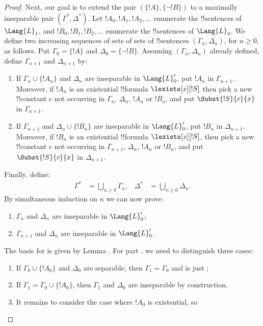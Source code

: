 \documentclass[../../include/open-logic-section]{subfiles}
\begin{document}
\begin{proof}
Next, our goal is to extend the pair $(\{ !A \}, \{\lnot!B\})$ to a
maximally inseparable pair $(\Gamma^*, \Delta^*)$.  Let $!A_0, !A_1,
!A_2, \dots$ enumerate the !!{sentence}s of $\Lang{L}_1$, and $!B_0,
!B_1, !B_2, \dots$ enumerate the !!{sentence}s of $\Lang{L}_2$. We
define two increasing sequences of sets of sets of !!{sentence}s
$(\Gamma_n, \Delta_n)$, for $n \ge 0$, as follows. Put $\Gamma_0 = \{
!A\}$ and $\Delta_0 = \{\lnot !B \}$. Assuming $(\Gamma_n, \Delta_n)$
already defined, define $\Gamma_{n+1}$ and $\Delta_{n+1}$ by:
\begin{enumerate}
\item If $\Gamma_n \cup \{!A_n \}$ and $\Delta_n$ are inseparable in
  $\Lang{L}'_0$, put $!A_n$ in $\Gamma_{n+1}$. Moreover, if $!A_n$ is
  an existential !!{formula} $\lexists[x][!S]$ then pick a new
  !!{constant} $c$ not occurring in $\Gamma_n$, $\Delta_n$, $!A_n$ or
  $!B_n$, and put $\Subst{!S}{c}{x}$ in $\Gamma_{n+1}$.
\item If $\Gamma_{n+1}$ and $\Delta_n \cup \{!B_n \}$ are inseparable
  in $\Lang{L}'_0$, put $!B_n$ in $\Delta_{n+1}$. Moreover, if $!B_n$
  is an existential !!{formula} $\lexists[x][!S]$, then pick a new
  !!{constant} $c$ not occurring in $\Gamma_{n+1}$, $\Delta_n$, $!A_n$
  or $!B_n$, and put $\Subst{!S}{c}{x}$ in $\Delta_{n+1}$.
\end{enumerate}
Finally, define:
\begin{align*}
  \Gamma^* & = \bigcup_{n\ge 0} \Gamma_n, & 
  \Delta^* & = \bigcup_{n\ge 0} \Delta_n.
\end{align*}
By simultaneous induction on $n$ we can now prove:
\begin{enumerate}
\item{} $\Gamma_n$ and $\Delta_n$ are inseparable in
  $\Lang{L}'_0$;
\item{} $\Gamma_{n+1}$ and $\Delta_n$ are inseparable in
    $\Lang{L}'_0$.
\end{enumerate}
The basis for  is given by Lemma . For
part , we need to distinguish three cases:
\begin{enumerate}
\item If $\Gamma_0 \cup \{!A_0 \}$ and $\Delta_0$ are separable, then
  $\Gamma_1 = \Gamma_0$ and  is just ;
\item If $\Gamma_1 = \Gamma_0 \cup\{ !A_0\}$, then $\Gamma_1$ and
  $\Delta_0$ are inseparable by construction.
\item It remains to consider the case where $!A_0$ is existential, so

\end{enumerate}
\end{proof}
\end{document}

